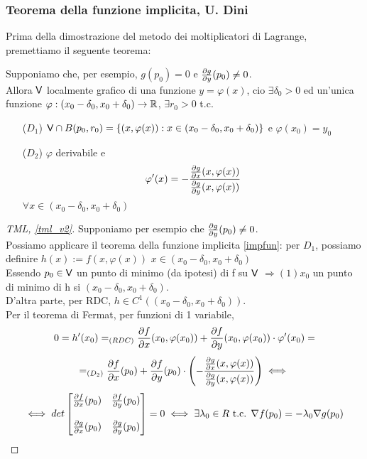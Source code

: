 \subsubsection{Teorema della funzione implicita, U. Dini}
Prima della dimostrazione del metodo dei moltiplicatori di Lagrange, premettiamo il seguente teorema:
\begin{theorem} \label{impfun}
  Supponiamo che, per esempio, $g(p_0)=0$ e $\frac{\partial g}{\partial y} (p_0)\neq 0$. \\
  Allora $\mathsf{V}$ \ace localmente grafico di una funzione $y = \varphi(x)$, cio\ace 
  $\exists \delta_0 > 0$ ed \ace un'unica funzione $\varphi: (x_0-\delta_0, x_0+\delta_0) \to \mathbb{R}$, 
  $\exists r_0 > 0$ t.c.
  \begin{enumerate}
    \item[($D_1$)] $\mathsf{V} \cap B(p_0,r_0) = \{(x,\varphi(x)): x \in (x_0-\delta_0, x_0+\delta_0)\}$ e $\varphi(x_0)=y_0$ 
    \item[($D_2$)] $\varphi$ \ace derivabile e 
                    $$\varphi'(x) = -\frac{\frac{\partial g}{\partial x}(x,\varphi(x))}{\frac{\partial g}{\partial y}(x,\varphi(x))}$$ 
                    $\forall x \in (x_0-\delta_0, x_0+\delta_0)$ 
  \end{enumerate}
\end{theorem}
\begin{proof}[TML, \ref*{tml_v2}]
  Supponiamo per esempio che $\frac{\partial g}{\partial y}(p_0) \neq 0$. \\
  Possiamo applicare il teorema della funzione implicita \ref*{impfun}: per $D_1$, possiamo definire $h(x):= f(x,\varphi(x))$
  $x \in (x_0-\delta_0, x_0+\delta_0)$ \\
  Essendo $p_0 \in \mathsf{V}$ un punto di minimo (da ipotesi) di f su $\mathsf{V}$ $\Rightarrow (1) x_0$ \ace un punto di minimo di 
  h si $(x_0-\delta_0, x_0+\delta_0)$. \\
  D'altra parte, per RDC, $h \in C^1\left((x_0-\delta_0, x_0+\delta_0)\right)$. \\  
  Per il teorema di Fermat, per funzioni di 1 variabile, 
  $$0 = h'(x_0) =_{(RDC)} \frac{\partial f}{\partial x}(x_0,\varphi(x_0)) + \frac{\partial f}{\partial y}(x_0,\varphi(x_0)) \cdot \varphi'(x_0) = $$
  $$=_{(D_2)} \frac{\partial f}{\partial x}(p_0) + \frac{\partial f}{\partial y}(p_0) \cdot \left(-\frac{\frac{\partial g}{\partial x}(x,\varphi(x))}{\frac{\partial g}{\partial y}(x,\varphi(x))}\right) \iff$$
  $$\iff det\begin{bmatrix}
    \frac{\partial f}{\partial x}(p_0) & \frac{\partial f}{\partial y} (p_0) \\
    \\
    \frac{\partial g}{\partial x}(p_0) & \frac{\partial g}{\partial y} (p_0) \\
  \end{bmatrix} = 0 \iff \exists \lambda_0 \in R \text{ t.c. } \nabla f(p_0) = -\lambda_0 \nabla g(p_0)$$
\end{proof}

